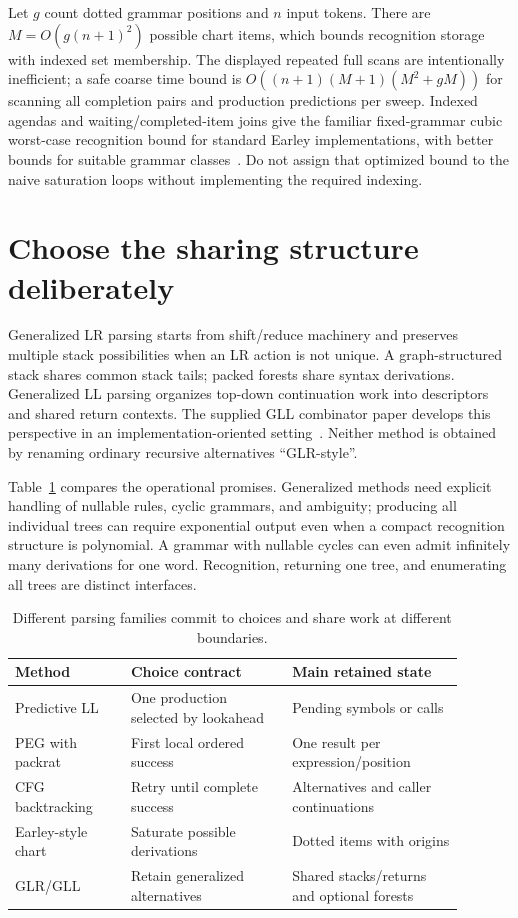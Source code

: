 Let $g$ count dotted grammar positions and $n$ input tokens.
There are $M=O(g(n+1)^2)$ possible chart items, which bounds recognition storage with indexed set membership.
The displayed repeated full scans are intentionally inefficient; a safe coarse time bound is $O((n+1)(M+1)(M^2+gM))$ for scanning all completion pairs and production predictions per sweep.
Indexed agendas and waiting/completed-item joins give the familiar fixed-grammar cubic worst-case recognition bound for standard Earley implementations, with better bounds for suitable grammar classes~\cite{grune-2008-parsing}.
Do not assign that optimized bound to the naive saturation loops without implementing the required indexing.

\section{Choose the sharing structure deliberately}
\label{sec:ch51-families}

Generalized LR parsing starts from shift/reduce machinery and preserves multiple stack possibilities when an LR action is not unique.
A graph-structured stack shares common stack tails; packed forests share syntax derivations.
Generalized LL parsing organizes top-down continuation work into descriptors and shared return contexts.
The supplied GLL combinator paper develops this perspective in an implementation-oriented setting~\cite{vanbinsbergen-2018-gll}.
Neither method is obtained by renaming ordinary recursive alternatives \enquote{GLR-style}.

Table~\ref{tab:ch51-families} compares the operational promises.
Generalized methods need explicit handling of nullable rules, cyclic grammars, and ambiguity; producing all individual trees can require exponential output even when a compact recognition structure is polynomial.
A grammar with nullable cycles can even admit infinitely many derivations for one word.
Recognition, returning one tree, and enumerating all trees are distinct interfaces.

\begin{table}[htbp]
\caption{Different parsing families commit to choices and share work at different boundaries.}
\label{tab:ch51-families}
\centering
\begin{tabular}{p{0.23\linewidth}p{0.32\linewidth}p{0.34\linewidth}}
\toprule
Method & Choice contract & Main retained state \\
\midrule
Predictive LL & One production selected by lookahead & Pending symbols or calls \\
PEG with packrat & First local ordered success & One result per expression/position \\
CFG backtracking & Retry until complete success & Alternatives and caller continuations \\
Earley-style chart & Saturate possible derivations & Dotted items with origins \\
GLR/GLL & Retain generalized alternatives & Shared stacks/returns and optional forests \\
\bottomrule
\end{tabular}
\end{table}

